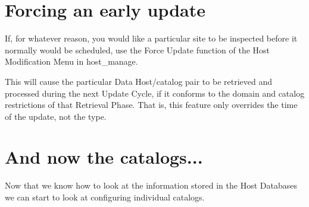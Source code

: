 \section{Forcing an early update}

If, for whatever reason, you would like a particular site to be inspected
before it normally would be scheduled, use the Force Update function of the
Host Modification Menu in host\_manage.

This will cause the particular Data Host/catalog pair to be retrieved and
processed during the next Update Cycle, if it conforms to the domain and
catalog restrictions of that Retrieval Phase. That is, this feature only
overrides the time of the update, not the type.

\section{And now the catalogs...}

Now that we know how to look at the information stored in the Host Databases
we can start to look at configuring individual catalogs.



